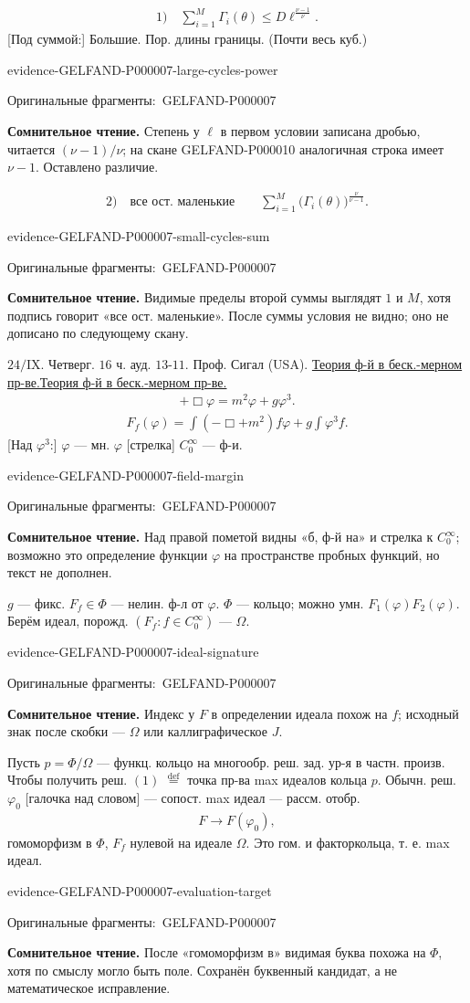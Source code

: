 \documentclass[11pt]{article}
\let\MathUnderline\underline
\renewcommand{\underline}[1]{\ifmmode\MathUnderline{#1}\else\uline{#1}\fi}
\newcommand{\EvidenceBlock}[4]{%
 \par\smallskip\noindent\begin{minipage}{\linewidth}
 \begin{minipage}[t]{.47\linewidth}\vspace{0pt}\centering
 \csname evidence-#1-#2\endcsname\par
 {\scriptsize\SourceCropCaption\ #1}\par
 \end{minipage}\hfill
 \begin{minipage}[t]{.49\linewidth}\vspace{0pt}\raggedright
 {\small\color{orange!65!black}\textbf{#4} #3}\par
 \end{minipage}
 \end{minipage}\par\smallskip}
\newcommand{\Unclear}[3]{\EvidenceBlock{#1}{#2}{#3}{\ReadingCaption}}
\newcommand{\SourceCropCaption}{Оригинальные фрагменты:}\newcommand{\ReadingCaption}{Сомнительное чтение.}\newcommand{\IncompleteCaption}{Неразобранный фрагмент.}\newcommand{\DiagramCaption}{Рисунок и набранное описание.}
\begin{document}
\begin{gather*}
 1)\quad\sum_{i=1}^{M}\Gamma_i(\theta)
 \le D\ell^{\frac{\nu-1}{\nu}}.
\end{gather*}
[Под суммой:] Большие.
Пор. длины границы. (Почти весь куб.)
\Unclear{GELFAND-P000007}{large-cycles-power}{Степень у $\ell$ в первом условии записана дробью, читается $(\nu-1)/\nu$; на скане GELFAND-P000010 аналогичная строка имеет $\nu-1$. Оставлено различие.}
\begin{gather*}
 2)\quad\text{все ост. маленькие}\qquad
 \sum_{i=1}^{M}\bigl(\Gamma_i(\theta)\bigr)^{\frac\nu{\nu-1}}.
\end{gather*}
\Unclear{GELFAND-P000007}{small-cycles-sum}{Видимые пределы второй суммы выглядят $1$ и $M$, хотя подпись говорит «все ост. маленькие». После суммы условия не видно; оно не дописано по следующему скану.}
[Разделительная черта.]

$24/\mathrm{IX}$.
Четверг. $16$ ч. ауд. $13$-$11$.
Проф. Сигал (USA).
\underline{Теория ф-й в беск.-мерном пр-ве.}
\begin{gather*}
 +\Box\varphi=m^2\varphi+g\varphi^3.
\end{gather*}
\begin{gather*}
 F_f(\varphi)=\int(-\Box+m^2)f\varphi
 +g\int\varphi^3 f.
\end{gather*}
[Над $\varphi^3$:] $\varphi$ — мн.
$\varphi$ [стрелка] $C_0^\infty$ — ф-и.
\Unclear{GELFAND-P000007}{field-margin}{Над правой пометой видны «б, ф-й на» и стрелка к $C_0^\infty$; возможно это определение функции $\varphi$ на пространстве пробных функций, но текст не дополнен.}
$g$ — фикс.
$F_f\in\Phi$ — нелин. ф-л от $\varphi$.
$\Phi$ — кольцо; можно умн. $F_1(\varphi)F_2(\varphi)$.
Берём идеал, порожд. $(F_f:f\in C_0^\infty)$ — $\Omega$.
\Unclear{GELFAND-P000007}{ideal-signature}{Индекс у $F$ в определении идеала похож на $f$; исходный знак после скобки — $\Omega$ или каллиграфическое $J$.}
Пусть $p=\Phi/\Omega$ — функц. кольцо на многообр. реш.
зад. ур-я в частн. произв.
Чтобы получить реш. $(1)$ $\overset{\mathrm{def}}=$
точка пр-ва max идеалов кольца $p$.
Обычн. реш. $\varphi_0$ [галочка над словом] — сопост. max идеал — рассм. отобр.
\begin{gather*}
 F\longrightarrow F(\varphi_0),
\end{gather*}
гомоморфизм в $\Phi$,
$F_f$ нулевой на идеале $\Omega$.
Это гом. и факторкольца, т. е. max идеал.
\Unclear{GELFAND-P000007}{evaluation-target}{После «гомоморфизм в» видимая буква похожа на $\Phi$, хотя по смыслу могло быть поле. Сохранён буквенный кандидат, а не математическое исправление.}
\end{document}
